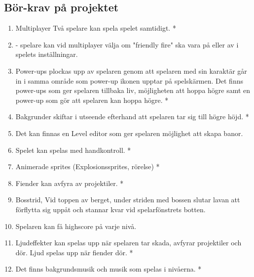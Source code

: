 \documentclass{TDP005mall}
\begin{document}
\subsection{Bör-krav på projektet}
\begin{enumerate}
\item Multiplayer Två spelare kan spela spelet samtidigt. *
\item - spelare kan vid multiplayer välja om "friendly fire" ska vara på eller av i spelets inställningar. 
\item Power-ups plockas upp av spelaren genom att spelaren med sin karaktär går in i samma område som power-up ikonen upptar på spelskärmen. Det finns power-ups som ger spelaren tillbaka liv, möjligheten att hoppa högre samt en power-up som gör att spelaren kan hoppa högre. *
\item Bakgrunder skiftar i utseende efterhand att spelaren tar sig till högre höjd. *
\item Det kan finnas en Level editor som ger spelaren möjlighet att skapa banor.
\item Spelet kan spelas med handkontroll. *
\item Animerade sprites (Explosionssprites, rörelse) *
\item Fiender kan avfyra av projektiler. *
\item Bosstrid, Vid toppen av berget, under striden med bossen slutar lavan att förflytta sig uppåt och stannar kvar vid spelarfönstrets botten.
\item Spelaren kan få highscore på varje nivå.
\item Ljudeffekter kan spelas upp när spelaren tar skada, avfyrar projektiler och dör. Ljud spelas upp när fiender dör. *
\item Det finns bakgrundsmusik och musik som spelas i nivåerna. *
\end{enumerate}
\end{document}
